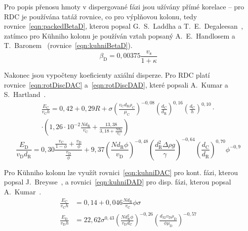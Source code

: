 Pro popis přenosu hmoty v dispergované fázi jsou užívány přímé korelace -- pro RDC je používána tatáž rovnice, co pro výplňovou kolonu, tedy rovnice~\ref{eqn:packedBetaD}, kterou popsal G.~S.~Laddha a T.~E.~Degaleesan~\cite{Laddha1978}, zatímco pro Kühniho kolonu je používán vztah popsaný A.~E.~Handlosem a T.~Baronem~\cite{Handlos1957} (rovnice~\ref{eqn:kuhniBetaD}).
\begin{equation}
\label{eqn:kuhniBetaD}
	\beta_\mathrm{D} = 0,00375 \frac{ v_\mathrm{s} }{ 1 + \kappa }
\end{equation}

Nakonec jsou vypočteny koeficienty axiální disperze.
Pro RDC platí rovnice~\ref{eqn:rotDiscDAC} a~\ref{eqn:rotDiscDAD}, které popsali A.~Kumar a S.~Hartland~\cite{Kumar1992}.
\begin{multline}
\label{eqn:rotDiscDAC}
	\frac{ E_\mathrm{C} }{v_\mathrm{C} h} = 0,42 + 0,29 R + \sigma
	\left( \frac{ v_\mathrm{C} d_\mathrm{R} \rho_\mathrm{C} }{ \mu_\mathrm{C} } \right)^{-0,08}
	\left( \frac{ d_\mathrm{C} }{ d_\mathrm{R} } \right)^{0,16}
	\left( \frac{ d_\mathrm{C} }{ h } \right)^{0,10} \cdot \\
	\cdot \left( 1,26 \cdot 10^{-2} \frac{ N d_\mathrm{R} }{ v_\mathrm{C} } + \frac{ 13,38 }{ 3,18 + \frac{ N d_\mathrm{R} }{ v_\mathrm{C} } } \right)
\end{multline}
\begin{equation}
\label{eqn:rotDiscDAD}
	\frac{ E_\mathrm{D} }{v_\mathrm{D} d_\mathrm{R}} =
	0,30 \frac{ \frac{ v_\mathrm{C} }{ 1-\phi } + \frac{ v_\mathrm{D} }{ \phi } }{ \frac{ v_\mathrm{D} }{ \phi } } +
	9,37 \left( \frac{ N d_\mathrm{R} \phi }{ v_\mathrm{D} } \right)^{-0,48}
	\left( \frac{ d_\mathrm{R}^2 \Delta\rho g }{ \gamma } \right)^{-0,64}
	\left( \frac{ d_\mathrm{C} }{ d_\mathrm{R} } \right)^{0,70} \phi^{-0,9}
\end{equation}

Pro Kühniho kolonu lze využít rovnici~\ref{eqn:kuhniDAC} pro kont. fázi, kterou popsal J.~Breysse~\cite{Breysse1984}, a rovnici~\ref{eqn:kuhniDAD} pro disp. fázi, kterou popsal A.~Kumar~\cite{Kumar1985}.
\begin{align}
\label{eqn:kuhniDAC}
	\frac{ E_\mathrm{C} }{v_\mathrm{C} h} &=
	0,14 + 0,046 \frac{ N d_\mathrm{R} }{ v_\mathrm{C} } \phi \sigma \\
\label{eqn:kuhniDAD}
	\frac{ E_\mathrm{D} }{v_\mathrm{D} h} &= 22,62 \sigma^{0,43}
	\left( \frac{ N d_\mathrm{R}^2 \phi }{ v_\mathrm{D} d_\mathrm{C} } \right)^{-0,26}
	\left( \frac{ d_{32} v_\mathrm{D} \rho_\mathrm{D} }{ \phi \mu_\mathrm{D} } \right)^{-0,57}
\end{align}




